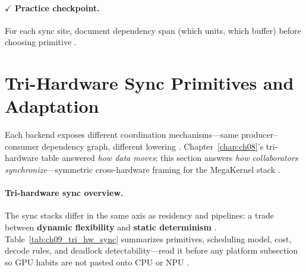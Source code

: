 \paragraph{$\checkmark$ Practice checkpoint.}
For each sync site, document dependency span (which units, which buffer) before choosing primitive \citep{yirage2026,chen2020compilerbasedhardw,shah2024flashattention3}.

\section{Tri-Hardware Sync Primitives and Adaptation}
\label{sec:ch09_hardware_sync_pick}

Each backend exposes different coordination mechanisms---same producer--consumer dependency graph, different lowering \citep{yirage2026,patel2025llminference,chen2020compilerbasedhardw}.
Chapter~\ref{chap:ch08}'s tri-hardware table answered \emph{how data moves}; this section answers \emph{how collaborators synchronize}---symmetric cross-hardware framing for the MegaKernel stack \citep{semianalysis2024tma,amd2024xdna,shah2024flashattention3}.

\paragraph{Tri-hardware sync overview.}
The sync stacks differ in the same axis as residency and pipelines: a trade between \textbf{dynamic flexibility} and \textbf{static determinism} \citep{yirage2026,amd2024aie,nvidia2022hopper}.
Table~\ref{tab:ch09_tri_hw_sync} summarizes primitives, scheduling model, cost, decode rules, and deadlock detectability---read it before any platform subsection so GPU habits are not pasted onto CPU or NPU \citep{patel2025llminference,chen2020compilerbasedhardw}.

